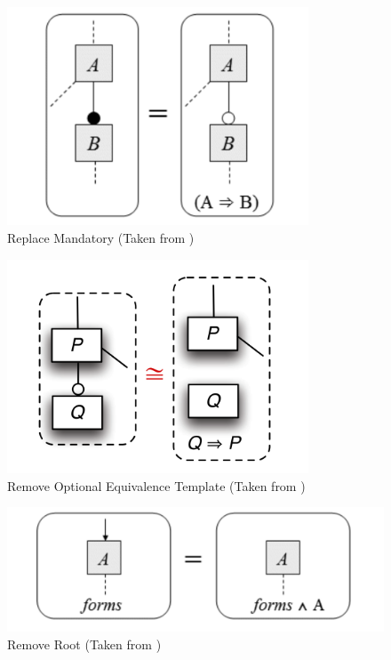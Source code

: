 \documentclass[12pt]{article}
\begin{document}
\begin{figure}[H]
\centering
\includegraphics[width=0.8\textwidth, frame]{images/ReplaceMandatory}
\caption{Replace Mandatory (Taken from \cite{jucs})}
\end{figure}

\begin{figure}[H]
\centering
\includegraphics[width=0.8\textwidth, frame]{images/RemoveOptional}
\caption{Remove Optional Equivalence Template (Taken from \cite{gttse})}
\end{figure}

\begin{figure}[H]
\centering
\includegraphics[width=1\textwidth, frame]{images/RemoveRoot}
\caption{Remove Root (Taken from \cite{jucs})}
\end{figure}
\end{document}
